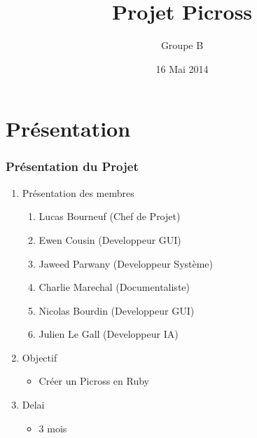 \documentclass[12pt]{beamer}
\title {Projet Picross}
\author{Groupe B}
\date{16 Mai 2014}
\institute{Université du Maine}
\begin{document}
\maketitle
\begin{frame}{}
  \tableofcontents
\end{frame}
   
\section{Présentation}
\begin{frame}
\frametitle{Présentation du Projet}
    \begin{enumerate}
     
      \item Présentation des membres
        \begin{enumerate}
        \item Lucas Bourneuf   (Chef de Projet)
        \item Ewen Cousin      (Developpeur GUI)
        \item Jaweed Parwany   (Developpeur Système)
        \item Charlie Marechal (Documentaliste)
        \item Nicolas Bourdin  (Developpeur GUI)
        \item Julien Le Gall    (Developpeur IA)
        \end{enumerate}\pause
     
      \item Objectif
        \begin{itemize}
            \item Créer un Picross en Ruby
        \end{itemize}\pause
     
      \item Delai
        \begin{itemize}
            \item 3 mois
        \end{itemize}
 \end{enumerate}   
 \end{frame}
    
\end{document}
